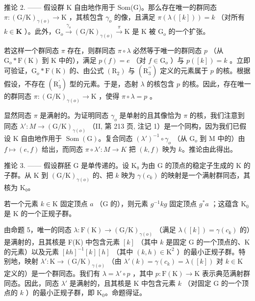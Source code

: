 推论 2. —— 假设群 K 自由地作用于 Som(G)。那么存在唯一的群同态 \(\pi\colon (\mathrm{G} / \mathrm{K})_{\gamma (o)}\to \mathrm{K}\) ，其核包含 \(\gamma_{o}\) 的像，且满足 \(\pi (\lambda ([k])) = k\) （对所有 \(k\in \mathbf{K}\) ）。此外，\(\mathrm{G}_o\xrightarrow{\gamma_o} (\mathrm{G} / \mathrm{K})_{\gamma (o)}\xrightarrow{\pi}\mathrm{K}\) 是 K 被 \(\mathrm{G}_o\) 的一个扩张。

若这样一个群同态 \(\pi\) 存在，则群同态 \(\pi \circ \lambda\) 必然等于唯一的群同态 \(p\) （从 \(\mathrm{G}_{o} * \mathrm{F}(\mathrm{K})\) 到 \(\mathrm{K}\) 中的），满足 \(p(f) = e\) （对 \(f \in \mathrm{G}_{o}\) ）与 \(p([k]) = k\) 。立即可验证，\(\mathrm{G}_{o} * \mathrm{F}(\mathrm{K})\) 的、由公式 \((\mathrm{R}_{2})\) 与 \((\mathrm{R}_{3}^{\prime \prime})\) 定义的元素属于 \(p\) 的核。根据假设，不存在 \((\mathrm{R}_{3}^{\prime})\) 型的元素。于是，态射 \(\lambda\) 的核包含 \(p\) 的核。因此，存在唯一的群同态 \(\pi: (\mathrm{G} / \mathrm{K})_{\gamma(o)} \to \mathrm{K}\) ，使得 \(\pi \circ \lambda = p\) 。

显然同态 \(\pi\) 是满射的。为证明同态 \(\gamma_{o}\) 是单射的且其像恰为 \(\pi\) 的核，我们注意到同态 \(\lambda'\colon M \to (\mathrm{G}/\mathrm{K})_{\gamma(o)}\) （II, 第 213 页, 注记 1）是一个同构，因为我们已假设 K 自由地作用于 \(\operatorname{Som}(\mathrm{G})\)。复合同态 \((\lambda')^{-1} \circ \gamma_{o}\) （从 \(\mathrm{G}_{o}\) 到 M 中的）由 \(f \mapsto (e, f)\) 给出，而同态 \(\pi \circ \lambda'\colon M \to K\) 把 \((k, f)\) 映为 \(k\)。推论由此得出。

推论 3. —— 假设群胚 G 是单传递的。设 K₀ 为由 G 的顶点的稳定子生成的 K 的子群。从 K 到 \((\mathrm{G}/\mathrm{K})_{\gamma(o)}\) 的、把 \(k\) 映为 \(\gamma(c_k)\) 的映射是一个满射群同态，其核为 K₀。

若一个元素 \(k \in \mathrm{K}\) 固定顶点 \(a\) （\(\mathrm{G}\) 的），则元素 \(g^{-1}kg\) 固定顶点 \(g^{*}a\) ；这蕴含 \(\mathrm{K}_{0}\) 是 \(\mathrm{K}\) 的一个正规子群。

由命题 5，唯一的同态 \(\lambda\colon\mathrm{F}(\mathrm{K})\to(\mathrm{G}/\mathrm{K})_{\gamma(o)}\) （满足 \(\lambda([k])=\gamma(c_k)\) 的）是满射的，且其核是 F(K) 中包含元素 \([k]\) （其中 \(k\) 是固定 G 的一个顶点的、K 的元素）以及元素 \([kh]^{-1}[k][h]\) （其中 \((k,h)\in\mathrm{K}^2\) ）的最小正规子群。特别地，映射 \(\lambda'\colon\mathrm{K}\to(\mathrm{G}/\mathrm{K})_{\gamma(o)}\) （由 \(\lambda'(k)=\gamma(c_k)=\lambda([k])\) 对 \(k\in\mathrm{K}\) 定义的）是一个群同态。我们有 \(\lambda=\lambda'\circ p\) ，其中 \(p\colon\mathrm{F}(\mathrm{K})\to\mathrm{K}\) 表示典范满射群同态。因此，同态 \(\lambda'\) 是满射的，且其核是 K 中包含元素 \(k\) （对固定 G 的一个顶点的 \(k\) ）的最小正规子群，即 \(\mathrm{K}_0\)。命题得证。
